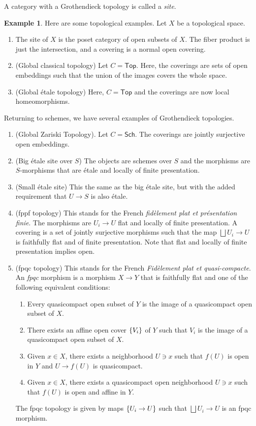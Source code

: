 \documentclass[leqno, openany]{memoir}
\theoremstyle{definition}
\newtheorem{exm}[thm]{Example}
\theoremstyle{remark}
\theoremstyle{plain}
\theoremstyle{definition}
\theoremstyle{remark}
\newcommand{\ms}[1]{\mathsf{#1}}
\begin{document}
A category with a Grothendieck topology is called a \textit{site}.

\begin{exm}
    Here are some topological examples. Let $X$ be a topological space.
    \begin{enumerate}
        \item The site of $X$ is the poset category of open subsets of $X$. The fiber product is just the intersection, and a covering is a normal open covering.
        \item (Global classical topology) Let $C = \ms{Top}$. Here, the coverings are sets of open embeddings such that the union of the images covers the whole space.
        \item (Global \'etale topology) Here, $C = \ms{Top}$ and the coverings are now local homeomorphisms.
    \end{enumerate}
\end{exm}

Returning to schemes, we have several examples of Grothendieck topologies.
\begin{enumerate}
    \item (Global Zariski Topology). Let $C = \ms{Sch}$. The coverings are jointly surjective open embeddings.
    \item (Big \'etale site over $S$) The objects are schemes over $S$ and the morphisms are $S$-morphisms that are \'etale and locally of finite presentation.
    \item (Small \'etale site) This the same as the big \'etale site, but with the added requirement that $U \to S$ is also \'etale.
    \item (fppf topology) This stands for the French \textit{fid\`element plat et pr\'esentation finie}. The morphisms are $U_i \to U$ flat and locally of finite presentation. A covering is a set of jointly surjective morphisms such that the map $\bigsqcup U_i \to U$ is faithfully flat and of finite presentation. Note that flat and locally of finite presentation implies open.
    \item (fpqc topology) This stands for the French \textit{Fid\`element plat et quasi-compacte}. An \textit{fpqc} morphism is a morphism $X \to Y$ that is faithfully flat and one of the following equivalent conditions:
        \begin{enumerate}
            \item Every quasicompact open subset of $Y$ is the image of a quasicompact open subset of $X$.
            \item There exists an affine open cover $\qty{V_i}$ of $Y$ such that $V_i$ is the image of a quasicompact open subset of $X$.
            \item Given $x \in X$, there exists a neighborhood $U \ni x$ such that $f(U)$ is open in $Y$ and $U \to f(U)$ is quasicompact.
            \item Given $x \in X$, there exists a quasicompact open neighborhood $U \ni x$ such that $f(U)$ is open and affine in $Y$.
        \end{enumerate}
        The fpqc topology is given by maps $\qty{U_i \to U}$ such that $\bigsqcup U_i \to U$ is an fpqc morphism.
\end{enumerate}
\end{document}
